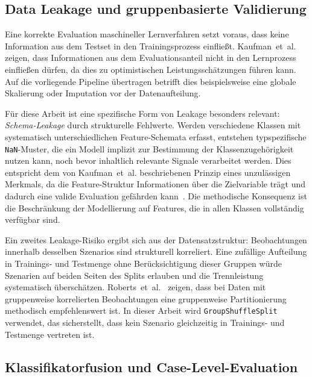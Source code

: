 \subsection{Data Leakage und gruppenbasierte Validierung}

Eine korrekte Evaluation maschineller Lernverfahren setzt voraus, dass keine
Information aus dem Testset in den Trainingsprozess einfließt. Kaufman~et~al.~\cite{kaufman2012leakage}
zeigen, dass Informationen aus dem Evaluationsanteil nicht in den Lernprozess
einfließen dürfen, da dies zu optimistischen Leistungsschätzungen führen kann.
Auf die vorliegende Pipeline übertragen betrifft dies beispielsweise eine globale
Skalierung oder Imputation vor der Datenaufteilung.

Für diese Arbeit ist eine spezifische Form von Leakage besonders relevant:
\emph{Schema-Leakage} durch strukturelle Fehlwerte. Werden verschiedene Klassen
mit systematisch unterschiedlichen Feature-Schemata erfasst, entstehen
typspezifische \texttt{NaN}-Muster, die ein Modell implizit zur Bestimmung der
Klassenzugehörigkeit nutzen kann, noch bevor inhaltlich relevante Signale
verarbeitet werden. Dies entspricht dem von \mbox{Kaufman}~et~al. beschriebenen Prinzip eines
unzulässigen Merkmals, da die Feature-Struktur Informationen über die
Zielvariable trägt und dadurch eine valide Evaluation gefährden
kann~\cite{kaufman2012leakage}. Die methodische Konsequenz ist die Beschränkung der
Modellierung auf Features, die in allen Klassen vollständig verfügbar sind.

Ein zweites Leakage-Risiko ergibt sich aus der Datensatzstruktur: Beobachtungen
innerhalb desselben Szenarios sind strukturell korreliert. Eine zufällige
Aufteilung in Trainings- und Testmenge ohne Berücksichtigung dieser Gruppen
würde Szenarien auf beiden Seiten des Splits erlauben und die Trennleistung
systematisch überschätzen. Roberts~et~al.~\cite{roberts2017cross} zeigen, dass
bei Daten mit gruppenweise korrelierten Beobachtungen eine gruppenweise Partitionierung
methodisch empfehlenswert ist. In dieser Arbeit wird \texttt{GroupShuffleSplit} verwendet, das
sicherstellt, dass kein Szenario gleichzeitig in Trainings- und Testmenge vertreten
ist.

\subsection{Klassifikatorfusion und Case-Level-Evaluation}

